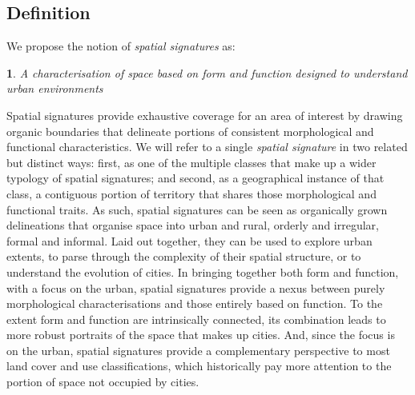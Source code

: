 \subsection{Definition}
\label{sec:ss_def}

We propose the notion of \textit{spatial signatures} as:

\newtheorem*{theorem}{}
\begin{theorem}
A characterisation of space based on form and function designed to understand
urban environments
\end{theorem}

Spatial signatures provide exhaustive coverage for an area of interest by
drawing organic boundaries that delineate portions of consistent morphological
and functional characteristics.
%
We will refer to a single \textit{spatial signature} in two related but
distinct ways: first, as one of the multiple classes that make up a wider
typology of spatial signatures; and second, as a geographical instance of that
class, a contiguous portion of territory that shares those morphological and
functional traits.
As such, spatial signatures can be seen as organically grown delineations that
organise space into urban and rural, orderly and irregular, formal and informal.
%
Laid out together, they can be used to explore urban extents, to parse through
the complexity of their spatial structure, or to understand the evolution of
cities.
In bringing together both form and function, with a focus on the urban,
spatial signatures provide a nexus between purely morphological
characterisations and those entirely based on function.
%
To the extent form and function are intrinsically connected, its
combination leads to more robust portraits of the space that makes up cities.
And, since the focus is on the urban, spatial signatures provide a complementary
perspective to most land cover and use classifications, which historically
pay more attention to the portion of space not occupied by cities.


